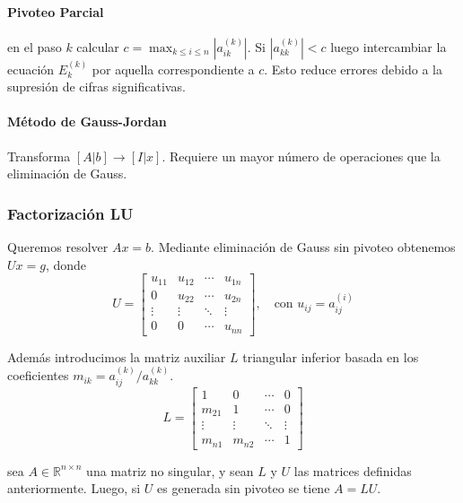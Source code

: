 \hypertarget{pivoteo-parcial}{%
\paragraph{Pivoteo Parcial}\label{pivoteo-parcial}}

en el paso \(k\) calcular \(c = \max_{k \leq i \leq n} |a_{ik}^{(k)}|\).
Si \(|a_{kk}^{(k)}| < c\) luego intercambiar la ecuación \(E_k^{(k)}\)
por aquella correspondiente a \(c\). Esto reduce errores debido a la
supresión de cifras significativas.

\hypertarget{muxe9todo-de-gauss-jordan}{%
\paragraph{Método de Gauss-Jordan}\label{muxe9todo-de-gauss-jordan}}

Transforma \([A | b] \longrightarrow [I | x]\). Requiere un mayor número
de operaciones que la eliminación de Gauss.

\hypertarget{factorizaciuxf3n-lu}{%
\subsubsection{Factorización LU}\label{factorizaciuxf3n-lu}}

Queremos resolver \(Ax = b\). Mediante eliminación de Gauss sin pivoteo
obtenemos \(Ux = g\), donde \[
U = 
\begin{bmatrix}
u_{11} & u_{12} & \cdots & u_{1n} \\
0 & u_{22} & \cdots & u_{2n} \\
\vdots & \vdots & \ddots & \vdots \\
0 & 0 & \cdots & u_{nn}
\end{bmatrix}
, \quad \text{con } u_{ij} = a_{ij}^{(i)}
\]

Además introducimos la matriz auxiliar \(L\) triangular inferior basada
en los coeficientes \(m_{ik} = a_{ij}^{(k)} / a_{kk}^{(k)}.\) \[
L = 
\begin{bmatrix}
1 & 0 & \cdots & 0 \\
m_{21} & 1 & \cdots & 0 \\
\vdots & \vdots & \ddots & \vdots \\
m_{n1} & m_{n2} & \cdots & 1
\end{bmatrix}
\]

\Teorema sea \(A \in \ensuremath{\mathbb{R}}^{n \times n}\) una matriz
no singular, y sean \(L\) y \(U\) las matrices definidas anteriormente.
Luego, si \(U\) es generada sin pivoteo se tiene \(A = LU\).

